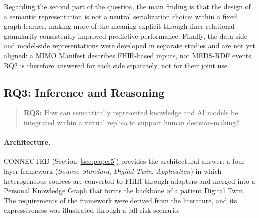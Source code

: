 Regarding the second part of the question, the main finding is that the design of a semantic representation is not a neutral serialization choice: within a fixed graph learner, making more of the meaning explicit through finer relational granularity consistently improved predictive performance. 
Finally, the data-side and model-side representations were developed in separate studies and are not yet aligned: a MIMO Manifest describes FHIR-based inputs, not MEDS-RDF events. RQ2 is therefore answered for each side separately, not for their joint use.

\subsection{RQ3: Inference and Reasoning}
\label{subsec:conclusions_rq3}

\begin{quote}
\textbf{RQ3:} How can semantically represented knowledge and AI models be integrated within a virtual replica to support human decision-making?
\end{quote}

\paragraph{Architecture.}
CONNECTED (Section~\ref{sec:paper5}) provides the architectural answer: a four-layer framework (\emph{Source}, \emph{Standard}, \emph{Digital Twin}, \emph{Application}) in which heterogeneous sources are converted to FHIR through adapters and merged into a Personal Knowledge Graph that forms the backbone of a patient Digital Twin. The requirements of the framework were derived from the literature, and its expressiveness was illustrated through a fall-risk scenario.%

